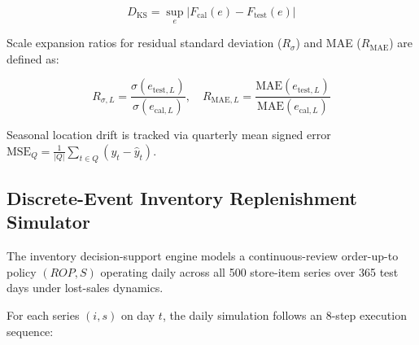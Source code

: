 \begin{equation}
D_{\text{KS}} = \sup_{e} \left| F_{\text{cal}}(e) - F_{\text{test}}(e) \right|
\end{equation}

Scale expansion ratios for residual standard deviation ($R_{\sigma}$) and MAE ($R_{\text{MAE}}$) are defined as:

\begin{equation}
R_{\sigma, L} = \frac{\sigma\left( e_{\text{test}, L} \right)}{\sigma\left( e_{\text{cal}, L} \right)}, \quad R_{\text{MAE}, L} = \frac{\text{MAE}\left( e_{\text{test}, L} \right)}{\text{MAE}\left( e_{\text{cal}, L} \right)}
\end{equation}

Seasonal location drift is tracked via quarterly mean signed error $\text{MSE}_Q = \frac{1}{|Q|} \sum_{t \in Q} (y_t - \hat{y}_t)$.

\subsection{Discrete-Event Inventory Replenishment Simulator}
The inventory decision-support engine models a continuous-review order-up-to policy $(ROP, S)$ operating daily across all 500 store-item series over 365 test days under lost-sales dynamics.

For each series $(i,s)$ on day $t$, the daily simulation follows an 8-step execution sequence:

